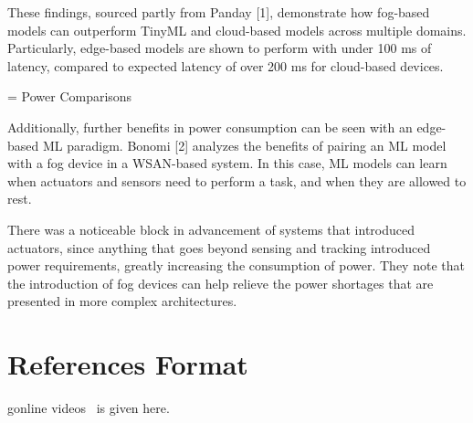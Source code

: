 \documentclass{sigchi}
\begin{document}
These findings, sourced partly from Panday [1], demonstrate how fog-based models can outperform TinyML and cloud-based models across multiple domains. Particularly, edge-based models are shown to perform with under 100 ms of latency, compared to expected latency of over 200 ms for cloud-based devices.

= Power Comparisons

Additionally, further benefits in power consumption can be seen with an edge-based ML paradigm. Bonomi [2] analyzes the benefits of pairing an ML model with a fog device in a WSAN-based system. In this case, ML models can learn when actuators and sensors need to perform a task, and when they are allowed to rest.  

There was a noticeable block in advancement of systems that introduced actuators, since anything that goes beyond sensing and tracking introduced power requirements, greatly increasing the consumption of power. They note that the introduction of fog devices can help relieve the power shortages that are presented in more complex architectures.


\balance{}

\section{References Format}
gonline videos~\cite{psy:gangnam} is given here.
\balance{}



\end{document}
